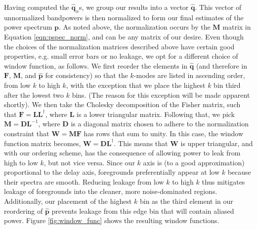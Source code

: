 \documentclass[twocolumn,numberedappendix]{emulateapj} \shorttitle{PSA64}
\newcommand{\qhat}{\hat{\mathbf{q}}}
\begin{document}
Having computed the $\qhat_{\alpha}$s, we group our results into a vector $\mathbf{\hat{q}}$.
This vector of unnormalized bandpowers is then normalized to form our final estimates of the
power spectrum $\mathbf{p}$. As noted above, the
normalization occurs by the $\mathbf{M}$ matrix in Equation
\eqref{eqn:pspec_norm}, and can be any matrix of our desire. 
Even though the choices of the normalization matrices described above have certain
good properties, e.g. small error bars or no leakage, we opt for a different
choice of window function, as follows. We first reorder the elements in $\mathbf{\hat{q}}$ (and
therefore in $\mathbf{F}$, $\mathbf{M}$, and $\mathbf{\hat{p}}$ for consistency) so that
the $k$-modes are listed in ascending order, from low $k$ to high $k$, with the exception that we place the highest $k$ bin third after the lowest two $k$ bins. (The reason for this exception will be made apparent shortly). We then take the Cholesky decomposition of
the Fisher matrix, such that $\mathbf{F}=\mathbf{L}\mathbf{L}^{\dagger}$, where
$\mathbf{L}$ is a lower triangular matrix. Following that, we pick ${\mathbf{M}} = \mathbf{D} \mathbf{L}^{-1}$, where $\mathbf{D}$ is a diagonal matrix chosen to adhere to the normalization constraint
that $\mathbf{W} = \mathbf{M} \mathbf{F}$ has rows that sum to unity. In this case, the window function matrix becomes,
$\mathbf{W}=\mathbf{D} \mathbf{L}^{\dagger}$. This means that $\mathbf{W}$ is upper triangular,
and with our ordering scheme, has the consequence of allowing power to leak from high to low $k$,
but not vice versa. Since our $k$ axis is (to a good approximation) proportional to the delay axis, foregrounds preferentially appear at low $k$ because their spectra are smooth. Reducing leakage
from low $k$ to high $k$ thus mitigates leakage
of foregrounds into the cleaner, more noise-dominated regions. Additionally, our placement of the highest $k$ bin as the third element in our reordering of 
$\mathbf{\hat{p}}$ prevents leakage from this edge bin that will contain aliased power. Figure
\ref{fig:window_func} shows the resulting window functions. 
\end{document}
